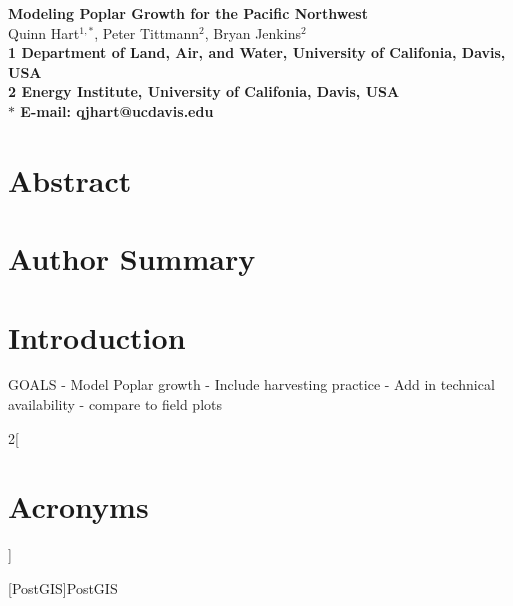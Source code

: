 \documentclass[10pt]{article}
\date{}
\begin{document}
\begin{flushleft}
{\Large
\textbf{Modeling Poplar Growth for the Pacific Northwest}
}
\\
Quinn Hart$^{1,\ast}$, 
Peter Tittmann$^{2}$, 
Bryan Jenkins$^{2}$
\\
\bf{1} Department of Land, Air, and Water, University of Califonia, Davis, USA
\\
\bf{2} Energy Institute, University of Califonia, Davis, USA
\\
$\ast$ E-mail: qjhart@ucdavis.edu
\end{flushleft}

\section*{Abstract}

\section*{Author Summary}

\section*{Introduction}

GOALS 
- Model Poplar growth
- Include harvesting practice
- Add in technical availability
- compare to field plots

\begin{multicols}{2}[\section*{Acronyms}]
{\normalsize
\raggedright
\begin{acronym}
[Post\textsc{GIS}]{Post\textsc{GIS}}
\end{acronym}
}
\end{multicols}
\end{document}
